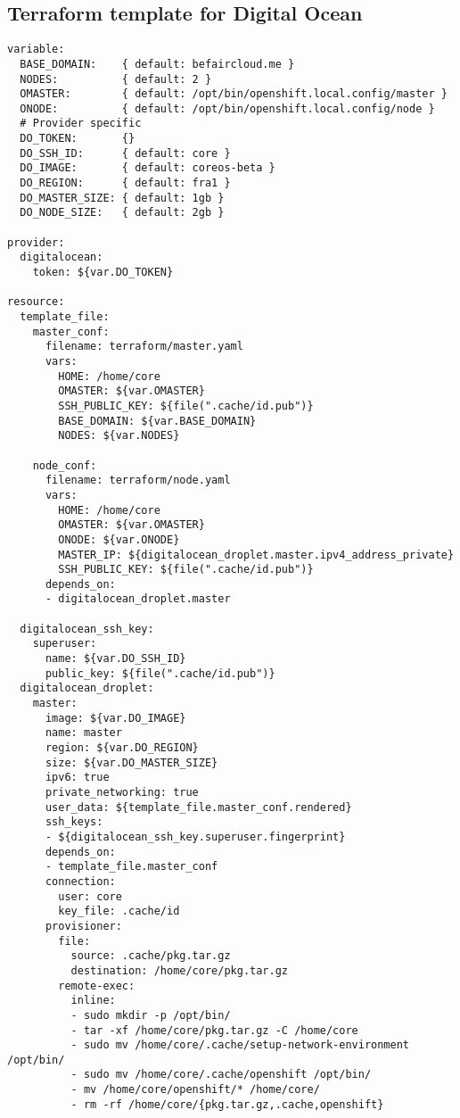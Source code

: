 \subsection{Terraform template for Digital
Ocean}\label{terraform-template-for-digital-ocean}

\begin{verbatim}
variable:
  BASE_DOMAIN:    { default: befaircloud.me }
  NODES:          { default: 2 }
  OMASTER:        { default: /opt/bin/openshift.local.config/master }
  ONODE:          { default: /opt/bin/openshift.local.config/node }
  # Provider specific
  DO_TOKEN:       {}
  DO_SSH_ID:      { default: core }
  DO_IMAGE:       { default: coreos-beta }
  DO_REGION:      { default: fra1 }
  DO_MASTER_SIZE: { default: 1gb }
  DO_NODE_SIZE:   { default: 2gb }

provider:
  digitalocean:
    token: ${var.DO_TOKEN}

resource:
  template_file:
    master_conf:
      filename: terraform/master.yaml
      vars:
        HOME: /home/core
        OMASTER: ${var.OMASTER}
        SSH_PUBLIC_KEY: ${file(".cache/id.pub")}
        BASE_DOMAIN: ${var.BASE_DOMAIN}
        NODES: ${var.NODES}

    node_conf:
      filename: terraform/node.yaml
      vars:
        HOME: /home/core
        OMASTER: ${var.OMASTER}
        ONODE: ${var.ONODE}
        MASTER_IP: ${digitalocean_droplet.master.ipv4_address_private}
        SSH_PUBLIC_KEY: ${file(".cache/id.pub")}
      depends_on:
      - digitalocean_droplet.master

  digitalocean_ssh_key:
    superuser:
      name: ${var.DO_SSH_ID}
      public_key: ${file(".cache/id.pub")}
  digitalocean_droplet:
    master:
      image: ${var.DO_IMAGE}
      name: master
      region: ${var.DO_REGION}
      size: ${var.DO_MASTER_SIZE}
      ipv6: true
      private_networking: true
      user_data: ${template_file.master_conf.rendered}
      ssh_keys:
      - ${digitalocean_ssh_key.superuser.fingerprint}
      depends_on:
      - template_file.master_conf
      connection:
        user: core
        key_file: .cache/id
      provisioner:
        file:
          source: .cache/pkg.tar.gz
          destination: /home/core/pkg.tar.gz
        remote-exec:
          inline:
          - sudo mkdir -p /opt/bin/
          - tar -xf /home/core/pkg.tar.gz -C /home/core
          - sudo mv /home/core/.cache/setup-network-environment /opt/bin/
          - sudo mv /home/core/.cache/openshift /opt/bin/
          - mv /home/core/openshift/* /home/core/
          - rm -rf /home/core/{pkg.tar.gz,.cache,openshift}


\end{verbatim}
